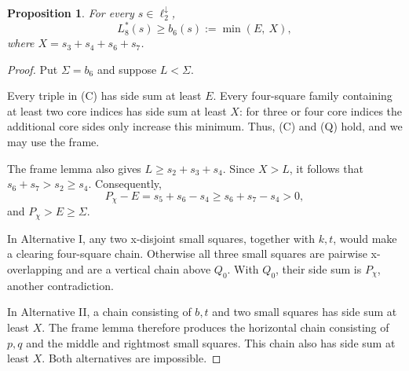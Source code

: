 \documentclass[12pt]{amsart}
\newtheorem{proposition}[theorem]{Proposition}
\theoremstyle{definition}
\theoremstyle{remark}
\numberwithin{equation}{section}
\numberwithin{figure}{section}
\numberwithin{table}{section}
\newcommand{\Pchi}{P_\chi}
\begin{document}
\begin{proposition}\label{prop:ell7}
For every $s\in\ell_2^\downarrow$,
\[
L_8^*(s)\ge b_6(s):=\min(E,\ X),
\]
where $X=s_3+s_4+s_6+s_7$.
\end{proposition}
\begin{proof}
Put \(\Sigma=b_6\) and suppose \(L<\Sigma\).

Every triple in (C) has side sum at least \(E\). Every four-square family
containing at least two core indices has side sum at least \(X\): for three
or four core indices the additional core sides only increase this minimum.
Thus, (C) and (Q) hold, and we may use the frame.

The frame lemma also gives \(L\ge s_2+s_3+s_4\). Since \(X>L\),
it follows that \(s_6+s_7>s_2\ge s_4\).
Consequently,
\begin{equation}\label{eq:PfromX}
\Pchi-E=s_5+s_6-s_4\ge s_6+s_7-s_4>0,
\end{equation}
and \(\Pchi>E\ge\Sigma\).

In Alternative I, any two x-disjoint small squares, together with
\(k,t\), would make a clearing four-square chain. Otherwise all three
small squares are pairwise x-overlapping and are a vertical chain above
\(Q_0\). With \(Q_0\), their side sum is \(\Pchi\), another contradiction.

In Alternative II, a chain consisting of \(b,t\) and two small squares
has side sum at least \(X\). The frame lemma therefore produces the horizontal
chain consisting of \(p,q\) and the middle and rightmost small
squares. This chain also has side sum at least \(X\). Both alternatives are impossible.
\end{proof}
\end{document}
